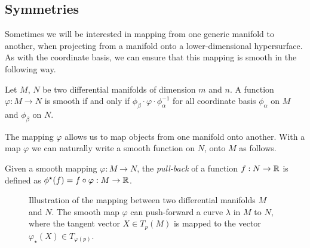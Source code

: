 \subsection{Symmetries}

Sometimes we will be interested in mapping from one generic manifold to another, \eg when projecting from a manifold onto a lower-dimensional hypersurface. As with the coordinate basis, we can ensure that this mapping is smooth in the following way.
\begin{defn}
	Let $M$, $N$ be two differential manifolds of dimension $m$ and $n$. A function $\varphi : M \rightarrow N$ is smooth if and only if $\phi_\beta \cdot \varphi \cdot \phi^{-1}_\alpha$ for all coordinate basis $\phi_\alpha$ on $M$ and $\phi_\beta$ on $N$. 
\end{defn}
The mapping $\varphi$ allows us to map objects from one manifold onto another. With a map $\varphi$ we can naturally write a smooth function on $N$, onto $M$ as follows. 
\begin{defn}
	Given a smooth mapping $\varphi : M \rightarrow N$, the \emph{pull-back} of a function $f : N \rightarrow {\mathbb{R}}$ is defined as $\phi^\star (f) = f \circ \varphi: M \rightarrow {\mathbb{R}}$.
\end{defn}

\begin{figure}[!h]
	\centering
	\caption[Illustration of the mapping between two differential manifolds $M$ and $N$]{Illustration of the mapping between two differential manifolds $M$ and $N$. The smooth map $\varphi$ can push-forward a curve $\lambda$ in $M$ to $N$, where the tangent vector $X \in T_p(M)$ is mapped to the vector $\varphi_\star(X) \in T_{\varphi(p)}$.}
\end{figure}

